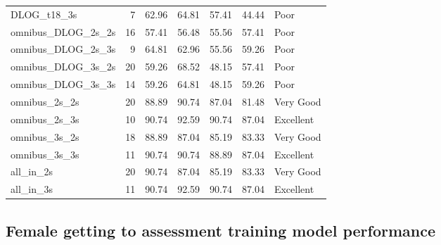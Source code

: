 \documentclass[a4paper,]{book}
\begin{document}
\begin{table}
\begin{tabular}[t]{lrrrrrl}
DLOG\_t18\_3s & 7 & 62.96 & 64.81 & 57.41 & 44.44 & Poor\\
omnibus\_DLOG\_2s\_2s & 16 & 57.41 & 56.48 & 55.56 & 57.41 & Poor\\
omnibus\_DLOG\_2s\_3s & 9 & 64.81 & 62.96 & 55.56 & 59.26 & Poor\\
\addlinespace
omnibus\_DLOG\_3s\_2s & 20 & 59.26 & 68.52 & 48.15 & 57.41 & Poor\\
omnibus\_DLOG\_3s\_3s & 14 & 59.26 & 64.81 & 48.15 & 59.26 & Poor\\
omnibus\_2s\_2s & 20 & 88.89 & 90.74 & 87.04 & 81.48 & Very Good\\
omnibus\_2s\_3s & 10 & 90.74 & 92.59 & 90.74 & 87.04 & Excellent\\
omnibus\_3s\_2s & 18 & 88.89 & 87.04 & 85.19 & 83.33 & Very Good\\
\addlinespace
omnibus\_3s\_3s & 11 & 90.74 & 90.74 & 88.89 & 87.04 & Excellent\\
all\_in\_2s & 20 & 90.74 & 87.04 & 85.19 & 83.33 & Very Good\\
all\_in\_3s & 11 & 90.74 & 92.59 & 90.74 & 87.04 & Excellent\\
\bottomrule
\end{tabular}
\end{table}

\hypertarget{female-getting-to-assessment-training-model-performance}{%
\subsection{Female getting to assessment training model performance}\label{female-getting-to-assessment-training-model-performance}}
\end{document}
